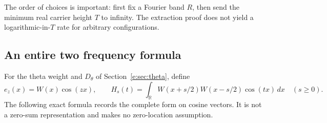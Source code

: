 \documentclass[11pt,a4paper]{article}
\numberwithin{equation}{section}
\theoremstyle{definition}\newtheorem{definition}[theorem]{Definition}
\theoremstyle{remark}\newtheorem{remark}[theorem]{Remark}
\newcommand{\R}{\mathbb R}\newcommand{\C}{\mathbb C}\newcommand{\N}{\mathbb N}
\begin{document}
The order of choices is important: first fix a Fourier band $R$, then
send the minimum real carrier height $T$ to infinity. The extraction proof
does not yield a logarithmic-in-$T$ rate for arbitrary configurations.


\subsection{An entire two frequency formula}\label{e:sec:kernel}

For the theta weight and $D_\theta$ of Section~\ref{e:sec:theta}, define
\begin{equation}\label{e:eq:overlap}
 e_z(x)=W(x)\cos(zx),\qquad
 H_s(t)=\int_\R W(x+s/2)W(x-s/2)\cos(tx)\,dx\quad(s\ge0).
\end{equation}
The following exact formula records the complete form on cosine vectors.
It is not a zero-sum representation and makes no zero-location assumption.
\end{document}
